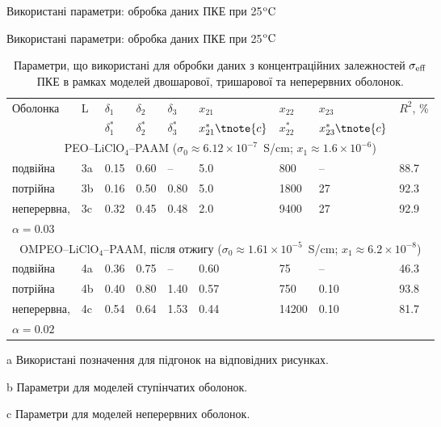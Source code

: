 \documentclass[10pt]{beamer}
\begin{document}
\begin{frame}{Використані параметри: обробка даних ПКЕ при 25$\rm ^{o}C$}
\end{frame}


\begin{frame}{Використані параметри: обробка даних ПКЕ при 25$\rm ^{o}C$}
\footnotesize

\begin{table}[tb]
	\centering 
	\caption{\label{tab:adjustable_params-2} Параметри, що
		використані для обробки даних з 
		концентраційних залежностей $\sigma_{\rm eff}$ ПКЕ в 
		рамках моделей двошарової, тришарової
		та неперервних оболонок.}
	\vspace{-5pt}
	\begin{threeparttable}
		\begin{tabular}{|l|l|l|l|l|l|l|l|l|}
			\hline
			\multirow{2}{*}{Оболонка} &\multirow{2}{*}{L\tnote{a}} & $\delta_1$\tnote{b} & $\delta_2$\tnote{b} & $\delta_3$\tnote{b} & $x_{21}$\tnote{b} & $x_{22}$\tnote{b} & $x_{23}$\tnote{b} & \multirow{2}{*}{$R^2$, \%} \\
			&  & $\delta^\ast_1$\tnote{c}& $\delta^\ast_2$\tnote{c}&$\delta^\ast_3$\tnote{c}&$x^\ast_{21}\tnote{c}$&$x^\ast_{22}$\tnote{c}&$x^\ast_{23} \tnote{c}$ & \\
			\hline
			\multicolumn{9}{c}{PEO--LiClO$_4$--PAAM ($\sigma_0 \approx 6.12\times 10^{-7}$~S/cm; $x_1 \approx 1.6 \times 10^{-6}$)}\\
			\hline
			подвійна &3a & 0.15&0.60& -- & 5.0           &800 &--& 88.7 \\
			потрійна  &3b              &0.16&0.50&0.80 & 5.0 &1800 &27 &  92.3 \\
			неперервна,  &3c                      &  0.32&0.45&0.48 & 2.0     &9400&27 & 92.9 \\
			$\alpha =0.03$ &   & & & & &  & & \\
			\hline
			\multicolumn{9}{c}{OMPEO--LiClO$_4$--PAAM, після отжигу ($\sigma_0 \approx 1.61\times 10^{-5}$~S/cm; $x_1 \approx 6.2\times 10^{-8}$)}\\
			\hline
			подвійна   &4a   &0.36&0.75& -- &0.60& 75 &--& 46.3\\
			потрійна   & 4b             &0.40&0.80&1.40&0.57& 750&0.10 &  93.8\\
			неперервна, &4c       &0.54&0.64&1.53&0.44&14200&0.10 &  81.7\\
			$\alpha =0.02$ &  &  & & & &  & & \\
			\hline
		\end{tabular}
		\begin{tablenotes}
			\item[a] Використані позначення для підгонок на відповідних
			рисунках.
			\item[b] Параметри для моделей ступінчатих оболонок.
			\item[c] Параметри для моделей неперервних оболонок.
		\end{tablenotes}
	\end{threeparttable}
\end{table}

\end{frame}
\end{document}

